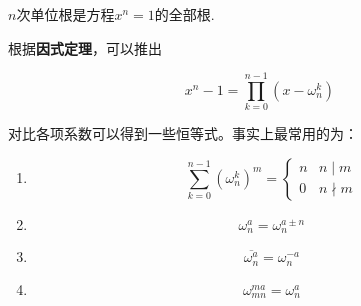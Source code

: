             \begin{proposition}[单位根的性质]
                $n$次单位根是方程$x^n=1$的全部根.
            \end{proposition}

            根据\textbf{因式定理}，可以推出

            \begin{equation}
                \label{eq:unit_root_factor}
                x^n-1=\prod_{k=0}^{n-1}(x-\omega_n^{k})
                \nonumber
            \end{equation}

            对比各项系数可以得到一些恒等式。事实上最常用的为：

            \begin{proposition}[单位根恒等式]
                \begin{enumerate}
                    \item
                        \begin{equation}
                            \label{eq:unit_root_identity1}
                            \sum_{k=0}^{n-1}(\omega_n^{k})^{m}=
                            \begin{cases}
                                n & n \mid m \\
                                0 & n \nmid m
                            \end{cases}
                            \nonumber
                        \end{equation}
                    \item
                        \begin{equation}
                            \label{eq:unit_root_identity2}
                            \omega_n^{a}=\omega_n^{a\pm n}
                            \nonumber
                        \end{equation}
                    \item
                        \begin{equation}
                            \label{eq:unit_root_identity3}
                            \overline{\omega_n^{a}}=\omega_n^{-a}
                            \nonumber
                        \end{equation}
                    \item
                        \begin{equation}
                            \label{eq:unit_root_identity4}
                            \omega_{mn}^{ma}=\omega_n^{a}
                            \nonumber
                        \end{equation}
                \end{enumerate}
            \end{proposition}

